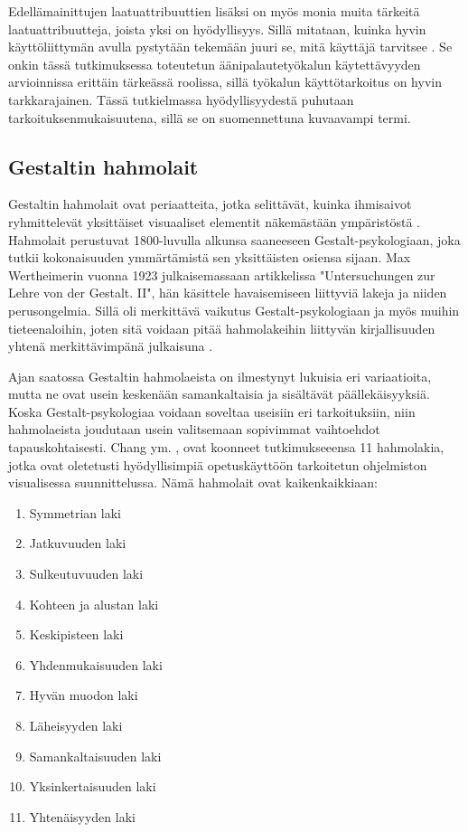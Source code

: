 \documentclass[utf8]{gradu3}
\begin{document}
Edellämainittujen laatuattribuuttien lisäksi on myös monia muita tärkeitä laatuattribuutteja, joista yksi on hyödyllisyys. Sillä mitataan, kuinka hyvin käyttöliittymän avulla pystytään tekemään juuri se, mitä käyttäjä tarvitsee \parencite[][]{intro-usability}. Se onkin tässä tutkimuksessa toteutetun äänipalautetyökalun käytettävyyden arvioinnissa erittäin tärkeässä roolissa, sillä työkalun käyttötarkoitus on hyvin tarkkarajainen. Tässä tutkielmassa hyödyllisyydestä puhutaan tarkoituksenmukaisuutena, sillä se on suomennettuna kuvaavampi termi.


\subsection{Gestaltin hahmolait}

Gestaltin hahmolait ovat periaatteita, jotka selittävät, kuinka ihmisaivot ryhmittelevät yksittäiset visuaaliset elementit näkemästään ympäristöstä \parencite[][]{koffka}. Hahmolait perustuvat 1800-luvulla alkunsa saaneeseen Gestalt-psykologiaan, joka tutkii kokonaisuuden ymmärtämistä sen yksittäisten osiensa sijaan. Max Wertheimerin vuonna 1923 julkaisemassaan artikkelissa "Untersuchungen zur Lehre von der Gestalt. II", hän käsittele havaisemiseen liittyviä lakeja ja niiden perusongelmia. Sillä oli merkittävä vaikutus Gestalt-psykologiaan ja myös muihin tieteenaloihin, joten sitä voidaan pitää hahmolakeihin liittyvän kirjallisuuden yhtenä merkittävimpänä julkaisuna \parencite[][]{rearranged}. 

Ajan saatossa Gestaltin hahmolaeista on ilmestynyt lukuisia eri variaatioita, mutta ne ovat usein keskenään samankaltaisia ja sisältävät päällekäisyyksiä. Koska Gestalt-psykologiaa voidaan soveltaa useisiin eri tarkoituksiin, niin hahmolaeista joudutaan usein valitsemaan sopivimmat vaihtoehdot tapauskohtaisesti. Chang ym. \parencite[][]{chang}, ovat koonneet tutkimukseeensa 11 hahmolakia, jotka ovat oletetusti hyödyllisimpiä opetuskäyttöön tarkoitetun ohjelmiston visualisessa suunnittelussa. Nämä hahmolait ovat kaikenkaikkiaan:

\begin{enumerate}
  \item Symmetrian laki
  \item Jatkuvuuden laki
  \item Sulkeutuvuuden laki
  \item Kohteen ja alustan laki
  \item Keskipisteen laki
  \item Yhdenmukaisuuden laki
  \item Hyvän muodon laki
  \item Läheisyyden laki
  \item Samankaltaisuuden laki
  \item Yksinkertaisuuden laki
  \item Yhtenäisyyden laki
\end{enumerate}
\end{document}
